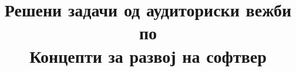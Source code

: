 \documentclass[11pt,twoside,a4paper]{article}
\title{Решени задачи од аудиториски вежби по\\ Концепти за развој на софтвер}
\author{}
\begin{document}
\renewcommand*\contentsname{Содржина}
\maketitle
\newpage

\tableofcontents

\newpage


















\end{document}
